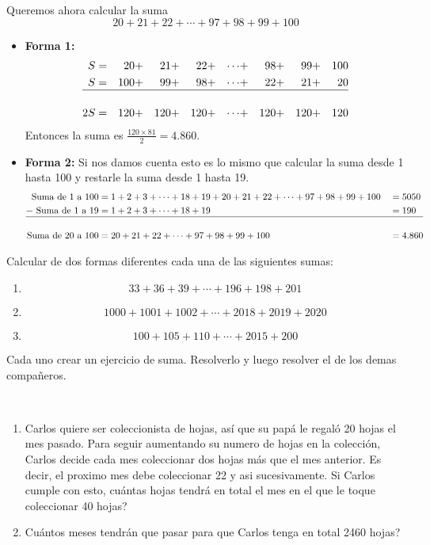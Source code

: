 \begin{ejemplo}
	Queremos ahora calcular la suma 
	\[
		20+21+22+\cdots+97 + 98 +99+100
	\]
	\begin{itemize}
	\item \textbf{Forma 1:} 
	\begin{align*}
	S&= &20&+&21&+&22&+&\cdots &+ &98&+&99&+&100\\
	S&= &100&+&99&+&98&+&\cdots&+& 22&+&21&+&20\\
	\hline\\
	2S&= &120 &+ &120 &+ &120 &+ &\cdots&+ &120 &+ &120 &+ &120
	\end{align*}
	Entonces la suma es $\frac{120\times 81}{2} = 4.860$.
	
	\item \textbf{Forma 2:} Si nos damos cuenta esto es lo mismo que calcular la suma desde 1 hasta 100 y restarle la suma desde 1 hasta 19.
	\begin{align*}
	\text{Suma de 1 a 100} &= 1+2+3+\cdots +18+19 \color{black}+20+21+22+\cdots+97 + 98 +99+100 &&= 5050 \\
	-\text{  Suma de 1 a 19} &= 1+2+3+\cdots +18+19 &&= 190\\
	\hline\\
	\text{Suma de 20 a 100} &=	20+21+22+\cdots+97 + 98 +99+100 &&= 4.860		
	\end{align*}
	\end{itemize}
\end{ejemplo}


\begin{exer}
	Calcular de dos formas diferentes cada una de las siguientes sumas:
	\begin{enumerate}[label=\Alph*)]
		\item  \[33+36+39+\cdots+196+ 198+201\]
		\item  \[1000+1001+1002+\cdots+2018+ 2019+2020\]
		\item \[100+105+110+\cdots +2015+200\]
	\end{enumerate}
\end{exer}


\begin{exer}
	Cada uno crear un ejercicio de suma. Resolverlo y luego resolver el de los demas compañeros.
\end{exer}

\begin{ejemplo}{\ \\}
	\begin{enumerate}[label=\Alph*)]
		\item Carlos quiere ser coleccionista de hojas, así que su papá le regaló 20 hojas el mes pasado. Para seguir aumentando su numero de hojas en la colección, Carlos decide cada mes coleccionar dos hojas más que el mes anterior. Es decir, el proximo mes debe coleccionar 22 y asi sucesivamente. Si Carlos cumple con esto, cuántas hojas tendrá en total el mes en el que le toque coleccionar 40 hojas? 
		\item Cuántos meses tendrán que pasar para que Carlos tenga en total 2460 hojas?
	\end{enumerate}
\end{ejemplo}

